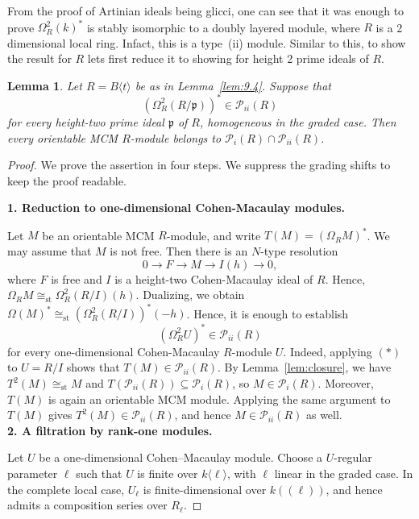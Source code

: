 \documentclass[11pt,letterpaper]{amsart}
\theoremstyle{plain}
\newtheorem{lem}[thm]{Lemma}
\theoremstyle{definition}
\theoremstyle{remark}
\begin{document}
From the proof of Artinian ideals being glicci, one can see that it was enough to prove $\Omega^2_R(k)^*$ is stably isomorphic to a doubly layered module, where $R$ is a 2 dimensional local ring. Infact, this is a type~(ii) module. Similar to this, to show the result for $R$ lets first reduce it to showing for height 2 prime ideals of $R$. 

\begin{lem}\label{lem:reduction-to-primes}
Let $R=B\langle t\rangle$ be as in Lemma~\ref{lem:9.4}. Suppose that \[ (\Omega_R^2(R/\mathfrak p))^* \in\mathcal P_{ii}(R) \] for every height-two prime ideal $\mathfrak p$ of $R$, homogeneous in the graded case. Then every orientable MCM $R$-module belongs to $\mathcal P_i(R)\cap\mathcal P_{ii}(R)$. \end{lem}

\begin{proof}
We prove the assertion in four steps. We suppress the grading shifts to keep the proof readable. 

\smallskip
\noindent
\textbf{1. Reduction to one-dimensional
Cohen-Macaulay modules.}

Let $M$ be an orientable MCM $R$-module, and write $T(M)=(\Omega_R M)^*$. We may assume that $M$ is not free. Then there is an $N$-type resolution \[ 0\longrightarrow F\longrightarrow M \longrightarrow I(h)\longrightarrow 0, \]
where $F$ is free and $I$ is a height-two Cohen-Macaulay ideal of $R$. Hence, $\Omega_R M\cong_{\mathrm{st}} \Omega_R^2(R/I)(h)$. Dualizing, we obtain $\Omega(M)^*\cong_{\mathrm{st}} (\Omega_R^2(R/I))^*(-h)$. Hence, it is enough to establish
\[ (\Omega_R^2 U)^*\in\mathcal P_{ii}(R) \]
for every one-dimensional Cohen-Macaulay $R$-module $U$. Indeed, applying $(*)$ to $U=R/I$ shows that $T(M)\in\mathcal P_{ii}(R)$. By Lemma~\ref{lem:closure}, we have $T^2(M)\cong_{\mathrm{st}}M$ and $T(\mathcal P_{ii}(R))\subseteq\mathcal P_i(R)$, so $M\in\mathcal P_i(R)$. Moreover, $T(M)$ is again an orientable MCM module. Applying the same argument to $T(M)$ gives $T^2(M)\in\mathcal P_{ii}(R)$, and hence $M\in\mathcal P_{ii}(R)$ as well.\\

\noindent\textbf{2. A filtration by rank-one modules.}


Let $U$ be a one-dimensional Cohen--Macaulay module.
Choose a $U$-regular parameter $\ell$ such that $U$
is finite over $k\langle\ell\rangle$, with $\ell$
linear in the graded case. In the complete local case,
$U_\ell$ is finite-dimensional over $k((\ell))$,
and hence admits a composition series over $R_\ell$.


\end{proof}
\end{document}
